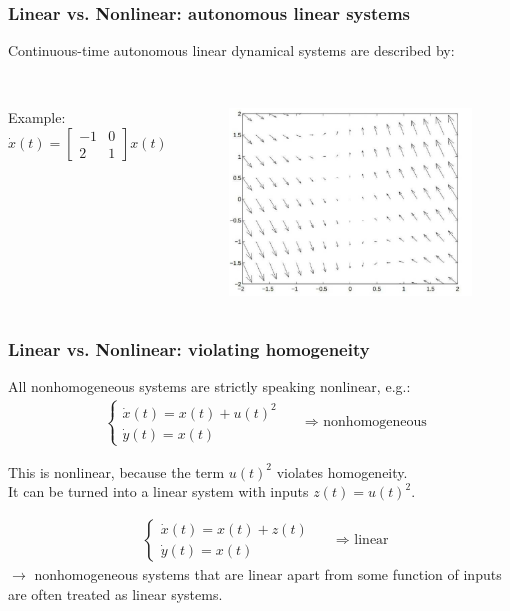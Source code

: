 \documentclass{beamer}
\begin{document}
\begin{frame}
\frametitle{Linear vs. Nonlinear: autonomous linear systems}
Continuous-time autonomous linear dynamical systems are described by:\\
\smallskip
{}\\
\begin{columns}
Example: $\dot{x}(t) = \begin{bmatrix} -1 & 0 \\ 2 & 1 \end{bmatrix} x(t)$

\begin{figure}
\includegraphics[width=1\linewidth]{autonomous}
\end{figure}
\end{columns}
\end{frame}


\begin{frame}
\frametitle{Linear vs. Nonlinear: violating homogeneity}
All nonhomogeneous systems are strictly speaking nonlinear, e.g.:\\
\begin{align*}
& \begin{cases}
\dot{x}(t) = x(t) + u(t)^{2}\\
\dot{y}(t) = x(t)
\end{cases} &&\text{$\Rightarrow$ nonhomogeneous}
\end{align*}

This is nonlinear, because the term $u(t)^{2}$ violates homogeneity.\\
It can be turned into a linear system with inputs $z(t) = u(t)^{2}$.

\begin{align*}
& \begin{cases}
\dot{x}(t) = x(t) + z(t)\\ 
\dot{y}(t) = x(t)
\end{cases} &&\text{$\Rightarrow$ linear}
\end{align*}
$\rightarrow$ nonhomogeneous systems that are linear apart from some function of inputs are often treated as linear systems.
\end{frame}
\end{document}
